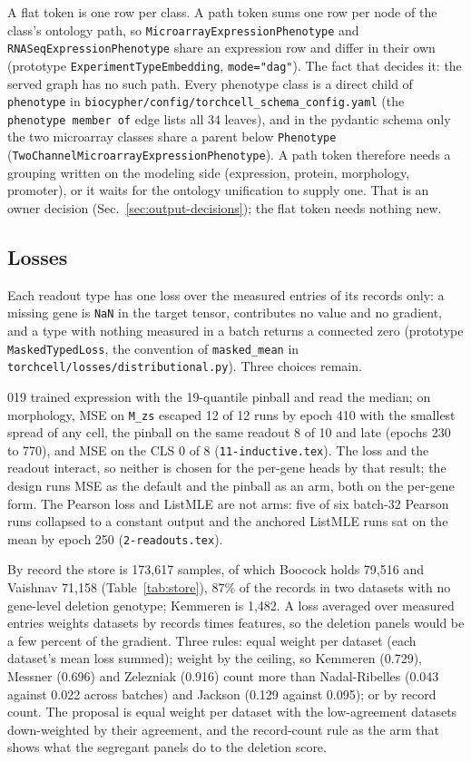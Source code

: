 A flat token is one row per class. A path token sums one row per node of the class's
ontology path, so \texttt{MicroarrayExpressionPhenotype} and
\texttt{RNASeqExpressionPhenotype} share an expression row and differ in their own
(prototype \texttt{ExperimentTypeEmbedding}, \texttt{mode="dag"}). The fact that decides
it: the served graph has no such path. Every phenotype class is a direct child of
\texttt{phenotype} in \texttt{biocypher/config/torchcell\_schema\_config.yaml} (the
\texttt{phenotype member of} edge lists all 34 leaves), and in the pydantic schema only
the two microarray classes share a parent below \texttt{Phenotype}
(\texttt{TwoChannelMicroarrayExpressionPhenotype}). A path token therefore needs a
grouping written on the modeling side (expression, protein, morphology, promoter), or it
waits for the ontology unification to supply one. That is an owner decision
(Sec.~\ref{sec:output-decisions}); the flat token needs nothing new.

\subsection{Losses}
\label{sec:output-losses}

Each readout type has one loss over the measured entries of its records only: a missing
gene is \texttt{NaN} in the target tensor, contributes no value and no gradient, and a type
with nothing measured in a batch returns a connected zero (prototype
\texttt{MaskedTypedLoss}, the convention of \texttt{masked\_mean} in
\texttt{torchcell/losses/distributional.py}). Three choices remain.

019 trained expression with the 19-quantile pinball and read the median; on morphology, MSE
on \texttt{M\_zs} escaped 12 of 12 runs by epoch 410 with the smallest spread of any cell,
the pinball on the same readout 8 of 10 and late (epochs 230 to 770), and MSE on the CLS 0
of 8 (\texttt{11-inductive.tex}). The loss and the readout interact, so neither is chosen
for the per-gene heads by that result; the design runs MSE as the default and the pinball
as an arm, both on the per-gene form. The Pearson loss and ListMLE are not arms: five of
six batch-32 Pearson runs collapsed to a constant output and the anchored ListMLE runs sat
on the mean by epoch 250 (\texttt{2-readouts.tex}).

By record the store is 173{,}617 samples, of which Boocock holds 79{,}516 and Vaishnav
71{,}158 (Table~\ref{tab:store}), 87\% of the records in two datasets with no gene-level
deletion genotype; Kemmeren is 1{,}482. A loss averaged over measured entries weights
datasets by records times features, so the deletion panels would be a few percent of the
gradient. Three rules: equal weight per dataset (each dataset's mean loss summed); weight
by the ceiling, so Kemmeren (0.729), Messner (0.696) and Zelezniak (0.916) count more
than Nadal-Ribelles (0.043 against 0.022 across batches) and Jackson (0.129 against
0.095); or by record count. The proposal is equal weight per dataset with the
low-agreement datasets down-weighted by their agreement, and the record-count rule as
the arm that shows what the segregant panels do to the deletion score.

